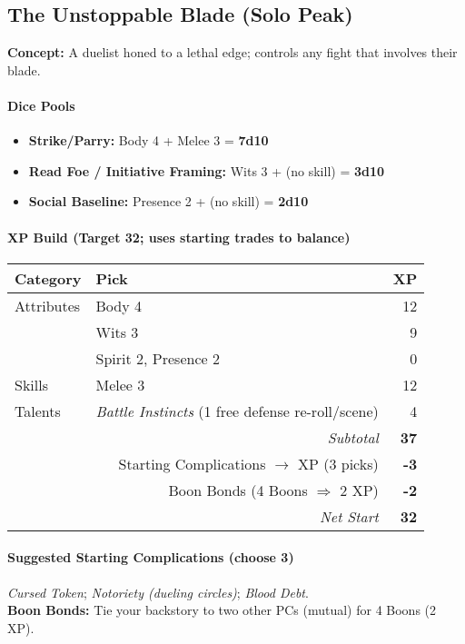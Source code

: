 \documentclass[11pt]{book}
\begin{document}
\subsection*{The Unstoppable Blade (Solo Peak)}
\textbf{Concept:} A duelist honed to a lethal edge; controls any fight that involves their blade.

\paragraph{Dice Pools}
\begin{itemize}
  \item \textbf{Strike/Parry:} Body 4 + Melee 3 = \textbf{7d10}
  \item \textbf{Read Foe / Initiative Framing:} Wits 3 + (no skill) = \textbf{3d10}
  \item \textbf{Social Baseline:} Presence 2 + (no skill) = \textbf{2d10}
\end{itemize}

\paragraph{XP Build (Target 32; uses starting trades to balance)}
\begin{tabular}{@{}llr@{}}
\toprule
\textbf{Category} & \textbf{Pick} & \textbf{XP} \\
\midrule
Attributes & Body 4 & 12 \\
           & Wits 3 & 9 \\
           & Spirit 2, Presence 2 & 0 \\
Skills     & Melee 3 & 12 \\
Talents    & \emph{Battle Instincts} (1 free defense re-roll/scene) & 4 \\
\midrule
\multicolumn{2}{r}{\textit{Subtotal}} & \textbf{37} \\
\multicolumn{2}{r}{Starting Complications $\rightarrow$ XP (3 picks)} & \textbf{-3} \\
\multicolumn{2}{r}{Boon Bonds (4 Boons $\Rightarrow$ 2 XP)} & \textbf{-2} \\
\midrule
\multicolumn{2}{r}{\textit{Net Start}} & \textbf{32} \\
\bottomrule
\end{tabular}

\paragraph{Suggested Starting Complications (choose 3)}
\emph{Cursed Token}; \emph{Notoriety (dueling circles)}; \emph{Blood Debt}.\\
\textbf{Boon Bonds:} Tie your backstory to two other PCs (mutual) for 4 Boons (2 XP).
\end{document}
